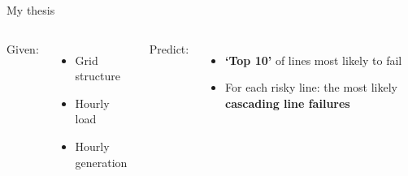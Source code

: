 \documentclass[10pt]{beamer}
\begin{document}
{
\begin{frame}[noframenumbering]
\end{frame}
}

\begin{frame}{My thesis}
    \begin{columns}[T,onlytextwidth]
    Given:
    \begin{itemize}
        \item Grid structure
        \item Hourly load
        \item Hourly generation
    \end{itemize}
    
    Predict:
    \begin{itemize}
        \item \textbf{`Top 10'} of lines most likely to fail
        \item For each risky line: the most likely \textbf{cascading line failures}
    \end{itemize}
    \end{columns}
\end{frame}

{
\begin{frame}[plain]
\end{frame}
}
\end{document}
